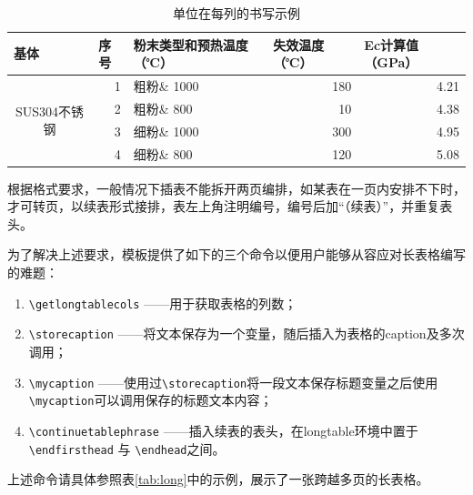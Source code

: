 \begin{table}[htbp]
  \centering
  \caption{单位在每列的书写示例}\label{tab:demo}
    \begin{tabular}{crlrr}
    \toprule
    \multicolumn{1}{l}{基体} & \multicolumn{1}{l}{序号} & 粉末类型和预热温度（℃） & \multicolumn{1}{l}{失效温度（℃）} & \multicolumn{1}{l}{Ec计算值（GPa）} \\
    \midrule
    \multirow{4}[2]{*}{SUS304不锈钢} & 1     & 粗粉\& 1000 & 180   & 4.21 \\
          & 2     & 粗粉\& 800 & 10    & 4.38 \\
          & 3     & 细粉\& 1000 & 300   & 4.95 \\
          & 4     & 细粉\& 800 & 120   & 5.08 \\
    \bottomrule
    \end{tabular}%
  \label{tab:addlabel}%
\end{table}%

根据格式要求，一般情况下插表不能拆开两页编排，如某表在一页内安排不下时，才可转页，以续表形式接排，表左上角注明编号，编号后加“（续表）”，并重复表头。

为了解决上述要求，模板提供了如下的三个命令以便用户能够从容应对长表格编写的难题：

\begin{enumerate}
    \item \texttt{\textbackslash getlongtablecols} ——用于获取表格的列数；
    \item \texttt{\textbackslash storecaption} ——将文本保存为一个变量，随后插入为表格的caption及多次调用；
    \item \texttt{\textbackslash mycaption} ——使用过\texttt{\textbackslash storecaption}将一段文本保存标题变量之后使用\texttt{\textbackslash mycaption}可以调用保存的标题文本内容；
    \item \texttt{\textbackslash continuetablephrase} ——插入续表的表头，在longtable环境中置于\texttt{\textbackslash endfirsthead} 与 \texttt{\textbackslash endhead}之间。
\end{enumerate}

上述命令请具体参照表\ref{tab:long}中的示例，展示了一张跨越多页的长表格\cite{2024lnmcm}。

